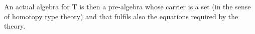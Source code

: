 \documentclass{easychair}
\begin{document}
An actual algebra for T is then a pre-algebra whose carrier is a set (in the
sense of homotopy type theory) and that fulfils also the equations required by
the theory.
\begin{code}%
\>[0][@{}l@{\AgdaIndent{1}}]%
\>[2]\AgdaSpace{}%
\AgdaSpace{}%
\AgdaSymbol{:}\AgdaSpace{}%
\AgdaSymbol{(}\AgdaSpace{}%
\AgdaSpace{}%
\AgdaSpace{}%
\AgdaSpace{}%
\AgdaSymbol{)}\AgdaSpace{}%
\AgdaSpace{}%
\AgdaSpace{}%
\<%
\\
\>[2][@{}l@{\AgdaIndent{0}}]%
\>[4][@{}l@{\AgdaIndent{0}}]%
\>[6]%
\>[19]\AgdaSymbol{:}\AgdaSpace{}%
\<%
\\
%
\>[4]\AgdaSpace{}%
\AgdaSpace{}%
\AgdaSpace{}%
\<%
\\
%
\>[4][@{}l@{\AgdaIndent{0}}]%
\>[6]%
\>[19]\AgdaSymbol{:}\AgdaSpace{}%
\AgdaSpace{}%
\<%
\\
%
\>[6]%
\>[19]\AgdaSymbol{:}%
\>[417I]\AgdaSpace{}%
\AgdaSymbol{\{}\AgdaSpace{}%
\AgdaSpace{}%
\AgdaSymbol{:}\AgdaSpace{}%
\AgdaSpace{}%
\sig\AgdaSpace{}%
\AgdaSymbol{\}}\AgdaSpace{}%
\<%
\\
\>[.][@{}l@{}]\<[417I]%
\>[21]\AgdaSpace{}%
\AgdaSpace{}%
\AgdaSpace{}%
\AgdaSpace{}%
\AgdaSpace{}%
\AgdaSpace{}%
\AgdaOperator{\AgdaDatatype{==}}\AgdaSpace{}%
\AgdaSpace{}%
\<%
\end{code}
\end{document}
